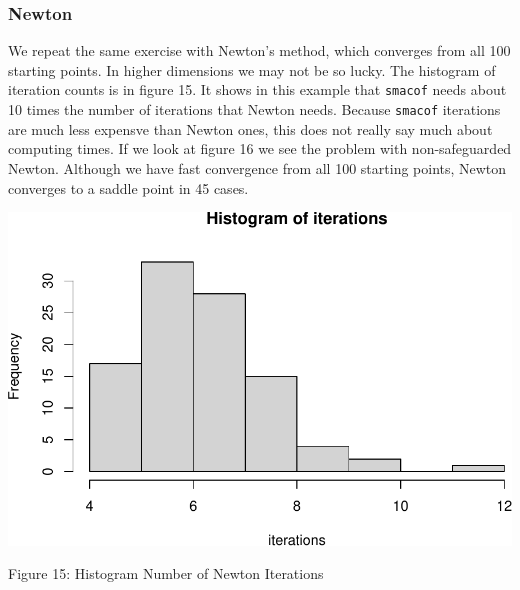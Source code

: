 \documentclass[
  12pt,
]{article}
\begin{document}
\subsubsection{Newton}\label{newton}

We repeat the same exercise with Newton's method, which converges from all 100 starting points. In higher dimensions we may not be so lucky. The histogram of
iteration counts is in figure 15. It shows in this example that \texttt{smacof} needs about 10 times the number of iterations that Newton needs. Because \texttt{smacof} iterations are much less expensve than Newton ones, this does not really say much about computing times. If we look at figure 16 we see the problem with non-safeguarded Newton. Although we have fast convergence from all 100 starting points, Newton converges to a saddle point in 45 cases.

\begin{center}\includegraphics{twoPoints_files/figure-latex/histogram_newton-1} \end{center}

Figure 15: Histogram Number of Newton Iterations
\end{document}
